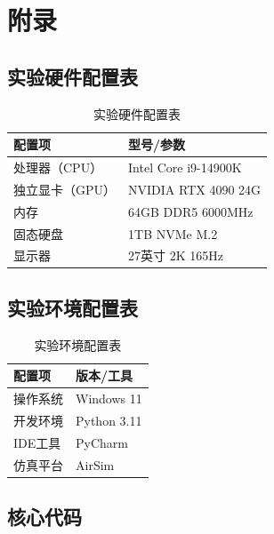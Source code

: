 \chapter{附录}

\section{实验硬件配置表}

\begin{table}[H]
\centering
\caption{实验硬件配置表}
\begin{tabular}{|l|l|}
\hline
\textbf{配置项} & \textbf{型号/参数} \\
\hline
处理器（CPU） & Intel Core i9-14900K \\
\hline
独立显卡（GPU） & NVIDIA RTX 4090 24G \\
\hline
内存 & 64GB DDR5 6000MHz \\
\hline
固态硬盘 & 1TB NVMe M.2 \\
\hline
显示器 & 27英寸 2K 165Hz \\
\hline
\end{tabular}
\end{table}

\section{实验环境配置表}

\begin{table}[H]
\centering
\caption{实验环境配置表}
\begin{tabular}{|l|l|}
\hline
\textbf{配置项} & \textbf{版本/工具} \\
\hline
操作系统 & Windows 11 \\
\hline
开发环境 & Python 3.11 \\
\hline
IDE工具 & PyCharm \\
\hline
仿真平台 & AirSim \\
\hline
\end{tabular}
\end{table}

\section{核心代码}

